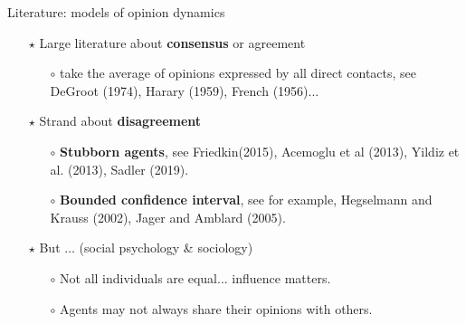 \documentclass[xcolor=table]{beamer}
\begin{document}
\begin{frame}{Literature: models of opinion dynamics}

		\begin{itemize} \setlength\itemsep{1em}
			\item[$\star$] Large literature about {\bf\color{purple}consensus} or agreement
				\begin{itemize} \smallskip
				
					\item[$\circ$] take the average of opinions expressed by all direct contacts, see DeGroot (1974), Harary (1959), French (1956)...
				\end{itemize} 
			\item[$\star$] Strand about {\bf\color{purple}disagreement} \smallskip
				\begin{itemize} \setlength\itemsep{1em} 
				
					\item[$\circ$]  {\bf\color{purple}Stubborn agents}, see Friedkin(2015), Acemoglu et al (2013), Yildiz et al. (2013), Sadler (2019). %
					\item[$\circ$] {\bf\color{purple}Bounded confidence interval}, see for example, Hegselmann and Krauss (2002), Jager and Amblard (2005). %
				\end{itemize}
		
		\item[$\star$] But ... (social psychology \& sociology) 
			\begin{itemize}
				\item[$\circ$] Not all individuals are equal... influence matters. 
				\item[$\circ$] Agents may not always share their opinions with others.  
			\end{itemize}
		\end{itemize}
\end{frame}
%
\end{document}
